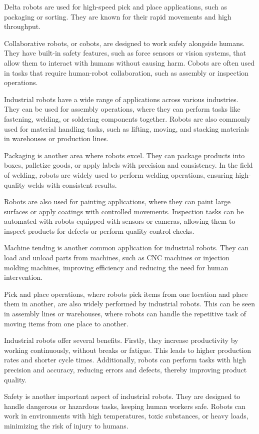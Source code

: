 Delta robots are used for high-speed pick and place applications, such as packaging or sorting. They are known for their rapid movements and high throughput.

Collaborative robots, or cobots, are designed to work safely alongside humans. They have built-in safety features, such as force sensors or vision systems, that allow them to interact with humans without causing harm. Cobots are often used in tasks that require human-robot collaboration, such as assembly or inspection operations.

Industrial robots have a wide range of applications across various industries. They can be used for assembly operations, where they can perform tasks like fastening, welding, or soldering components together. Robots are also commonly used for material handling tasks, such as lifting, moving, and stacking materials in warehouses or production lines.

Packaging is another area where robots excel. They can package products into boxes, palletize goods, or apply labels with precision and consistency. In the field of welding, robots are widely used to perform welding operations, ensuring high-quality welds with consistent results.

Robots are also used for painting applications, where they can paint large surfaces or apply coatings with controlled movements. Inspection tasks can be automated with robots equipped with sensors or cameras, allowing them to inspect products for defects or perform quality control checks.

Machine tending is another common application for industrial robots. They can load and unload parts from machines, such as CNC machines or injection molding machines, improving efficiency and reducing the need for human intervention.

Pick and place operations, where robots pick items from one location and place them in another, are also widely performed by industrial robots. This can be seen in assembly lines or warehouses, where robots can handle the repetitive task of moving items from one place to another.

Industrial robots offer several benefits. Firstly, they increase productivity by working continuously, without breaks or fatigue. This leads to higher production rates and shorter cycle times. Additionally, robots can perform tasks with high precision and accuracy, reducing errors and defects, thereby improving product quality.

Safety is another important aspect of industrial robots. They are designed to handle dangerous or hazardous tasks, keeping human workers safe. Robots can work in environments with high temperatures, toxic substances, or heavy loads, minimizing the risk of injury to humans.

